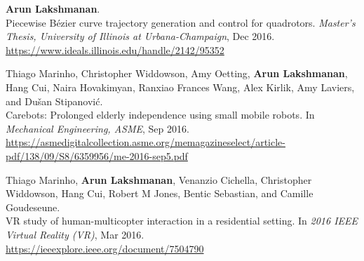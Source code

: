 \documentclass[11pt]{article}
\newenvironment{lonelist}[1][\enskip\textbullet]%
        {\vspace{-\baselineskip}\begin{list}{#1}{%
        \setlength{\partopsep}{0pt}%
        \setlength{\topsep}{0pt}}}
        {\end{list}\vspace{-.6\baselineskip}}
\begin{document}
\begin{lonelist}
\item[] \textbf{Arun Lakshmanan}.\\
Piecewise Bézier curve trajectory generation and control for quadrotors. 
\textit{Master's Thesis, University of Illinois at Urbana-Champaign}, Dec 2016. \\
\url{https://www.ideals.illinois.edu/handle/2142/95352} \bigskip

\item[] Thiago Marinho, Christopher Widdowson, Amy Oetting, \textbf{Arun Lakshmanan}, Hang Cui, Naira Hovakimyan, Ranxiao Frances Wang, Alex Kirlik, Amy Laviers, and Dušan Stipanović.\\
Carebots: Prolonged elderly independence using small mobile robots. In \textit{Mechanical Engineering, ASME}, Sep 2016. \\
\url{https://asmedigitalcollection.asme.org/memagazineselect/article-pdf/138/09/S8/6359956/me-2016-sep5.pdf} \bigskip

\item[] Thiago Marinho, \textbf{Arun Lakshmanan}, Venanzio Cichella, Christopher Widdowson, Hang Cui, Robert M Jones, Bentic Sebastian, and Camille Goudeseune.\\
VR study of human-multicopter interaction in a residential setting. In \textit{2016 IEEE Virtual Reality (VR)}, Mar 2016. \\
\url{https://ieeexplore.ieee.org/document/7504790} 

\end{lonelist}
\end{document}
